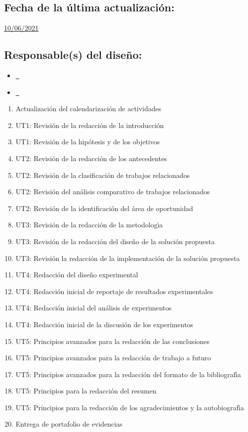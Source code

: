 \documentclass[10 pt]{article}
\begin{document}
\subsection{Fecha de la \'{u}ltima actualizaci\'{o}n:} \underline{10/06/2021}
\subsection{Responsable(s) del dise\~{n}o:}
\begin{itemize}[label={}]
\item \underline{\nroger~\roger}
\item \underline{\nelisa~\elisa}
\end{itemize}
\newpage



\begin{enumerate}[itemsep=-2pt]
\item Actualizaci\'{o}n del calendarizaci\'{o}n de actividades
\item UT1: Revisi\'{o}n de la redacci\'{o}n de la introducci\'{o}n
\item UT1: Revisi\'{o}n de la hip\'{o}tesis y de los objetivos
\item UT2: Revisi\'{o}n de la redacci\'{o}n de los antecedentes
\item UT2: Revisi\'{o}n de la clasificaci\'{o}n de trabajos relacionados
\item UT2: Revisi\'{o}n del an\'{a}lisis comparativo de trabajos relacionados
\item UT2: Revisi\'{o}n de la identificaci\'{o}n del \'{a}rea de oportunidad
\item UT3: Revisi\'{o}n de la redacci\'{o}n de la metodolog\'{\i}a
\item UT3: Revisi\'{o}n de la redacci\'{o}n del dise\~{n}o de la soluci\'{o}n propuesta
\item UT3: Revisi\'{o}n la redacci\'{o}n de la implementaci\'{o}n de la soluci\'{o}n propuesta
\item UT4: Redacci\'{o}n del dise\~{n}o experimental
\item UT4: Redacci\'{o}n inicial de reportaje de resultados experimentales
\item UT4: Redacci\'{o}n inicial del an\'{a}lisis de experimentos
\item UT4: Redacci\'{o}n inicial de la discusi\'{o}n de los experimentos
\item UT5: Principios avanzados para la redacci\'{o}n de las conclusiones
\item UT5: Principios avanzados para la redacci\'{o}n de trabajo a futuro
\item UT5: Principios avanzados para la redacci\'{o}n del formato de la bibliograf\'{\i}a
\item UT5: Principios para la redacci\'{o}n del resumen
\item UT5: Principios para la redacci\'{o}n de los agradecimientos y la autobiograf\'{\i}a
\item Entrega de portafolio de evidencias
\end{enumerate}
\end{document}
